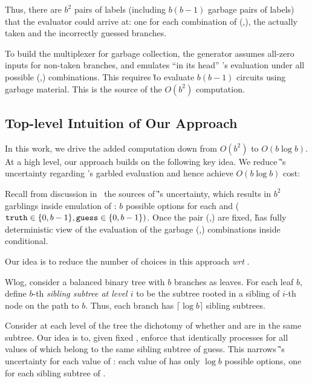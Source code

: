 Thus, there are $b^2$ pairs of labels (including  $b(b-1)$ garbage pairs of labels)  that the evaluator
could arrive at: one for each combination of (\truth,\guess), the  actually taken  and
the incorrectly guessed branches.
%


To build the multiplexer for garbage collection, the \HK generator assumes all-zero inputs for non-taken branches, and emulates ``in its head'' \E's evaluation under all possible (\truth,\guess) combinations.  
This requires \G to evaluate $b(b-1)$ circuits using garbage material.
This is the source of the $O(b^2)$ computation.


\subsection{Top-level Intuition of Our Approach}

In this work, we drive the added computation down from $O(b^2)$ to
$O(b \log b)$.
At a high level, our approach builds on the following key idea.  We reduce \G's uncertainty regarding \E's garbled evaluation and hence achieve $O(b\log b)$ cost:

\medskip
 
   Recall from discussion in~ the  sources of \G's uncertainty, which results in $b^2$ garblings inside emulation of \E: $b$ possible options for each \truth and \guess ($\mathtt{truth} \in\{0,b-1\}, \mathtt{guess}\in\{0,b-1\})$.
   Once the pair  (\truth,\guess) are fixed, \G has fully deterministic view of the evaluation of the garbage (\truth,\guess)  combinations inside conditional.
   
   Our idea  is to reduce the number of \truth choices in this approach {\em wrt  \guess}. 
  
  Wlog, consider a balanced binary tree with $b$ branches as leaves. 
  For each leaf $b$, define $b$-th {\em sibling subtree at level $i$} to be the subtree rooted in a sibling of $i$-th node on the path to $b$. Thus, each branch has $\lceil \log b \rceil$ sibling subtrees.
  
  Consider at each level of the tree the dichotomy of whether \guess and \truth are in the same subtree. Our idea is to, given fixed \guess, enforce that \E identically processes \guess for all values of \truth which belong to the same sibling subtree of guess. This narrows \G’s uncertainty for each value of \guess: each value of \guess has only $\log b$ possible \truth options, one for each sibling subtree of \guess.
    
